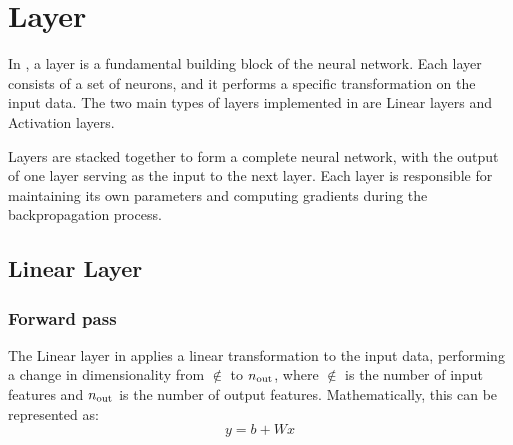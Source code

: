 \section{Layer}

In \mfnet, a layer is a fundamental building block of the neural network. Each layer consists of a set of neurons, and it performs a specific transformation on the input data. The two main types of layers implemented in \mfnet are Linear layers and Activation layers.


Layers are stacked together to form a complete neural network, with the output of one layer serving as the input to the next layer.  Each layer is responsible for maintaining its own parameters and computing gradients during the backpropagation process.


\subsection{Linear Layer}
\subsubsection{Forward pass}
The Linear layer in \mfnet applies a linear transformation to the input data, performing a change in dimensionality from $\nin$ to $n_\text{out}$, where $\nin$ is the number of input features and $n_\text{out}$ is the number of output features. Mathematically, this can be represented as:
\begin{equation}
    y = b + Wx
\end{equation}

